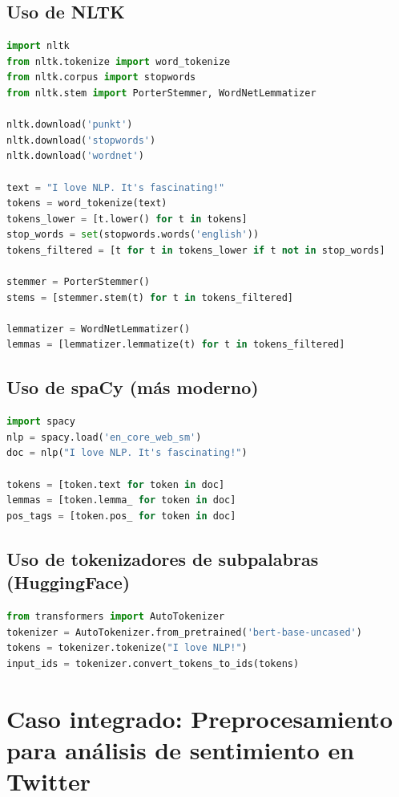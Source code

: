 \documentclass[12pt,a4paper,openany,oneside]{book}
\begin{document}
\subsection{Uso de NLTK}
\begin{lstlisting}[language=Python]
import nltk
from nltk.tokenize import word_tokenize
from nltk.corpus import stopwords
from nltk.stem import PorterStemmer, WordNetLemmatizer

nltk.download('punkt')
nltk.download('stopwords')
nltk.download('wordnet')

text = "I love NLP. It's fascinating!"
tokens = word_tokenize(text)
tokens_lower = [t.lower() for t in tokens]
stop_words = set(stopwords.words('english'))
tokens_filtered = [t for t in tokens_lower if t not in stop_words]

stemmer = PorterStemmer()
stems = [stemmer.stem(t) for t in tokens_filtered]

lemmatizer = WordNetLemmatizer()
lemmas = [lemmatizer.lemmatize(t) for t in tokens_filtered]
\end{lstlisting}

\subsection{Uso de spaCy (más moderno)}
\begin{lstlisting}[language=Python]
import spacy
nlp = spacy.load('en_core_web_sm')
doc = nlp("I love NLP. It's fascinating!")

tokens = [token.text for token in doc]
lemmas = [token.lemma_ for token in doc]
pos_tags = [token.pos_ for token in doc]
\end{lstlisting}

\subsection{Uso de tokenizadores de subpalabras (HuggingFace)}
\begin{lstlisting}[language=Python]
from transformers import AutoTokenizer
tokenizer = AutoTokenizer.from_pretrained('bert-base-uncased')
tokens = tokenizer.tokenize("I love NLP!")
input_ids = tokenizer.convert_tokens_to_ids(tokens)
\end{lstlisting}

\section{Caso integrado: Preprocesamiento para análisis de sentimiento en Twitter}
\end{document}
